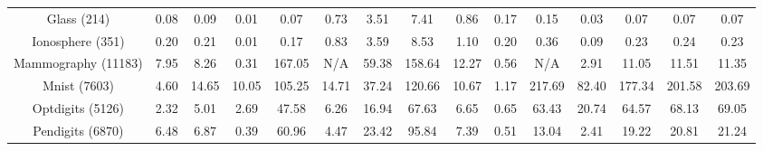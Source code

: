 \documentclass[sigconf,nonacm]{acmart}
\begin{document}
\begin{table*}[!t]
{\begin{tabular}{c||cc|ccc|cc||ccccccc}
    \multicolumn{1}{c||}{Glass (214)} & \multicolumn{1}{c}{0.08}&0.09 & \multicolumn{1}{c}{0.01} & \multicolumn{1}{c}{0.07} &   \multicolumn{1}{c}{0.73} & \multicolumn{1}{c|}{3.51} & \multicolumn{1}{c}{7.41} & \multicolumn{1}{c||}{0.86} & \multicolumn{1}{c}{0.17} & \multicolumn{1}{c}{0.15} & \multicolumn{1}{c}{0.03} & \multicolumn{1}{c}{0.07} & \multicolumn{1}{c}{0.07} & \multicolumn{1}{c}{0.07}\\
    
    \multicolumn{1}{c||}{Ionosphere (351)} & \multicolumn{1}{c}{0.20} &0.21& \multicolumn{1}{c}{0.01} & \multicolumn{1}{c}{0.17} &   \multicolumn{1}{c}{0.83} & \multicolumn{1}{c|}{3.59} & \multicolumn{1}{c}{8.53} & \multicolumn{1}{c||}{1.10} & \multicolumn{1}{c}{0.20} & \multicolumn{1}{c}{0.36} & \multicolumn{1}{c}{0.09} & \multicolumn{1}{c}{0.23} & \multicolumn{1}{c}{0.24} & \multicolumn{1}{c}{0.23}\\
    
    \multicolumn{1}{c||}{Mammography (11183)} & \multicolumn{1}{c}{7.95} & 8.26& \multicolumn{1}{c}{0.31} & \multicolumn{1}{c}{167.05} &   \multicolumn{1}{c}{N/A} & \multicolumn{1}{c|}{59.38} & \multicolumn{1}{c}{158.64} & \multicolumn{1}{c||}{12.27} & \multicolumn{1}{c}{0.56} & \multicolumn{1}{c}{N/A} & \multicolumn{1}{c}{2.91} & \multicolumn{1}{c}{11.05} & \multicolumn{1}{c}{11.51} & \multicolumn{1}{c}{11.35}\\
    
    \multicolumn{1}{c||}{Mnist (7603)} & \multicolumn{1}{c}{4.60} &14.65 & \multicolumn{1}{c}{10.05} & \multicolumn{1}{c}{105.25} &   \multicolumn{1}{c}{14.71} & \multicolumn{1}{c|}{37.24} & \multicolumn{1}{c}{120.66} & \multicolumn{1}{c||}{10.67} & \multicolumn{1}{c}{1.17} & \multicolumn{1}{c}{217.69} & \multicolumn{1}{c}{82.40} & \multicolumn{1}{c}{177.34} & \multicolumn{1}{c}{201.58} & \multicolumn{1}{c}{203.69}\\
    
    \multicolumn{1}{c||}{Optdigits (5126)} & \multicolumn{1}{c}{2.32} & 5.01 & \multicolumn{1}{c}{2.69} & \multicolumn{1}{c}{47.58} &   \multicolumn{1}{c}{6.26} & \multicolumn{1}{c|}{16.94} & \multicolumn{1}{c}{67.63} & \multicolumn{1}{c||}{6.65} & \multicolumn{1}{c}{0.65} & \multicolumn{1}{c}{63.43} & \multicolumn{1}{c}{20.74} & \multicolumn{1}{c}{64.57} & \multicolumn{1}{c}{68.13} & \multicolumn{1}{c}{69.05}\\
    
    \multicolumn{1}{c||}{Pendigits (6870)} & \multicolumn{1}{c}{6.48} & 6.87& \multicolumn{1}{c}{0.39} & \multicolumn{1}{c}{60.96} &   \multicolumn{1}{c}{4.47} & \multicolumn{1}{c|}{23.42} & \multicolumn{1}{c}{95.84} & \multicolumn{1}{c||}{7.39} & \multicolumn{1}{c}{0.51} & \multicolumn{1}{c}{13.04} & \multicolumn{1}{c}{2.41} & \multicolumn{1}{c}{19.22} & \multicolumn{1}{c}{20.81} & \multicolumn{1}{c}{21.24}\\
    

\end{tabular}}
\end{table*}
\end{document}

